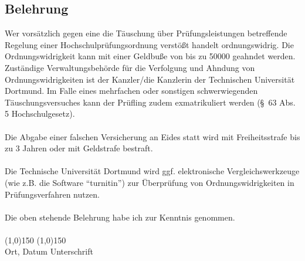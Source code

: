 \subsection*{Belehrung}
Wer vorsätzlich gegen eine die Täuschung über Prüfungsleistungen betreffende Regelung einer Hochschulprüfungsordnung verstößt handelt ordnungswidrig.
Die Ordnungswidrigkeit kann mit einer Geldbuße von bis zu \SI[round-mode=places, round-precision=2]{50000}{\officialeuro} geahndet werden.
Zuständige Verwaltungsbehörde für die Verfolgung und Ahndung von Ordnungswidrigkeiten ist der Kanzler/die Kanzlerin der Technischen Universität Dortmund.
Im Falle eines mehrfachen oder sonstigen schwerwiegenden Täuschungsversuches kann der Prüfling zudem exmatrikuliert werden (\S\ 63 Abs. 5 Hochschulgesetz). \\
\ \\
Die Abgabe einer falschen Versicherung an Eides statt wird mit Freiheitsstrafe bis zu 3 Jahren oder mit Geldstrafe bestraft. \\
\ \\
Die Technische Universität Dortmund wird ggf. elektronische Vergleichswerkzeuge (wie z.B. die Software \enquote{turnitin}) zur Überprüfung von Ordnungswidrigkeiten in Prüfungsverfahren nutzen. \\
\ \\
Die oben stehende Belehrung habe ich zur Kenntnis genommen.
\vspace*{1cm}
\ \\
\ \\
\line(1,0){150} \hfill \line(1,0){150}\\
Ort, Datum \hfill Unterschrift \hspace*{3cm}


